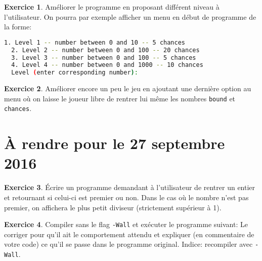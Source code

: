 \documentclass[french,a4paper]{article}
\theoremstyle{definition}
\newtheorem{exercise}{Exercice}
\theoremstyle{remark}
\newcommand{\shell}[1]{\lstinline[style=sh]|#1|}
\newcommand{\inlinec}[1]{\lstinline[style=C]°#1°}
\begin{document}
\begin{exercise}
  Améliorer le programme en proposant différent niveau à
  l'utilisateur. On pourra par exemple afficher un menu en début de
  programme de la forme:
  \begin{lstlisting}[language=sh,identifierstyle=\color{black}]
  1. Level 1 -- number between 0 and 10 -- 5 chances
  2. Level 2 -- number between 0 and 100 -- 20 chances
  3. Level 3 -- number between 0 and 100 -- 5 chances
  4. Level 4 -- number between 0 and 1000 -- 10 chances
  Level (enter corresponding number):
  \end{lstlisting}
\end{exercise}

\begin{exercise}
  Améliorer encore un peu le jeu en ajoutant une dernière option au
  menu où on laisse le joueur libre de rentrer lui même les nombres
  \inlinec{bound} et \inlinec{chances}.
\end{exercise}

\section{\`A rendre pour le 27 septembre 2016}
\label{sec:homeworks}

\begin{exercise}
  \'Ecrire un programme demandant à l'utilisateur de rentrer un entier
  et retournant si celui-ci est premier ou non. Dans le cas où le
  nombre n'est pas premier, on affichera le plus petit diviseur
  (strictement supérieur à 1).
\end{exercise}

\begin{exercise}
  Compiler sans le flag \shell{-Wall} et exécuter le programme
  suivant:  Le corriger pour qu'il ait le
  comportement attendu et expliquer (en commentaire de votre code) ce
  qu'il se passe dans le programme original. Indice: recompiler avec
  \shell{-Wall}.
\end{exercise}
\end{document}
